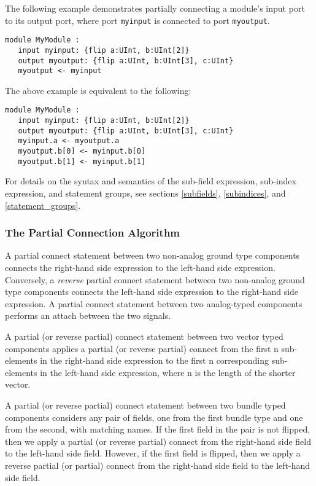 \documentclass[12pt]{article}
\begin{document}
The following example demonstrates partially connecting a module's input port to its output port, where port \verb|myinput| is connected to port \verb|myoutput|.
\begin{lstlisting}
module MyModule :
   input myinput: {flip a:UInt, b:UInt[2]}
   output myoutput: {flip a:UInt, b:UInt[3], c:UInt}
   myoutput <- myinput
\end{lstlisting}

The above example is equivalent to the following:
\begin{lstlisting}
module MyModule :
   input myinput: {flip a:UInt, b:UInt[2]}
   output myoutput: {flip a:UInt, b:UInt[3], c:UInt}
   myinput.a <- myoutput.a
   myoutput.b[0] <- myinput.b[0]
   myoutput.b[1] <- myinput.b[1]
\end{lstlisting}
For details on the syntax and semantics of the sub-field expression, sub-index expression, and statement groups, see sections \ref{subfields}, \ref{subindices}, and \ref{statement_groups}.

\subsubsection{The Partial Connection Algorithm} \label{partial_connection_algorithm}

A partial connect statement between two non-analog ground type components connects the right-hand side expression to the left-hand side expression. Conversely, a {\em reverse} partial connect statement between two non-analog ground type components connects the left-hand side expression to the right-hand side expression. A partial connect statement between two analog-typed components performs an attach between the two signals.

A partial (or reverse partial) connect statement between two vector typed components applies a partial (or reverse partial) connect from the first n sub-elements in the right-hand side expression to the first n corresponding sub-elements in the left-hand side expression, where n is the length of the shorter vector.

A partial (or reverse partial) connect statement between two bundle typed components considers any pair of fields, one from the first bundle type and one from the second, with matching names. If the first field in the pair is not flipped, then we apply a partial (or reverse partial) connect from the right-hand side field to the left-hand side field. However, if the first field is flipped, then we apply a reverse partial (or partial) connect from the right-hand side field to the left-hand side field.
\end{document}
